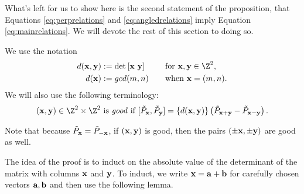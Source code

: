 What's left for us to show here is the second statement of the proposition, that Equations \eqref{eq:perprelations} and \eqref{eq:angledrelations} imply Equation \eqref{eq:mainrelations}. We will devote the rest of this section to doing so.



We use the notation
\begin{align*} 
d(\xx, \yy) &:= \det\left[\xx\,\, \yy\right] \quad \quad \,\,  \textrm{for } \xx, \yy \in \Z^2, \\
d(\xx) &:= gcd(m,n) \quad \quad \textrm{when } \xx = (m,n).
\end{align*} 
We will also use the following terminology: 
\[
(\xx,\yy) \in \Z^2 \times \Z^2 \textrm{ is \emph{good} if  } [\tilde{P}_\xx,\tilde{P}_\yy] = \{d(\xx,\yy)\} \left( \tilde{P}_{\xx+\yy}-\tilde{P}_{\xx-\yy} \right).
\]

\begin{remark}\label{remark_goodsymmetry}
Note that because $\tilde{P}_{{\mathbf{x}}}=\tilde{P}_{-{\mathbf{x}}}$, if $({\mathbf{x}}, {\mathbf{y}})$ is good, then the pairs $(\pm{\mathbf{x}}, \pm{\mathbf{y}})$ are good as well. 
\end{remark}

The idea of the proof is to induct on the absolute value of the determinant of the matrix with columns ${\mathbf{x}}$ and ${\mathbf{y}}$. To induct, we write ${\mathbf{x}} = {\mathbf{a}} + {\mathbf{b}}$ for carefully chosen vectors ${\mathbf{a}}, {\mathbf{b}}$ and then use the following lemma. 

